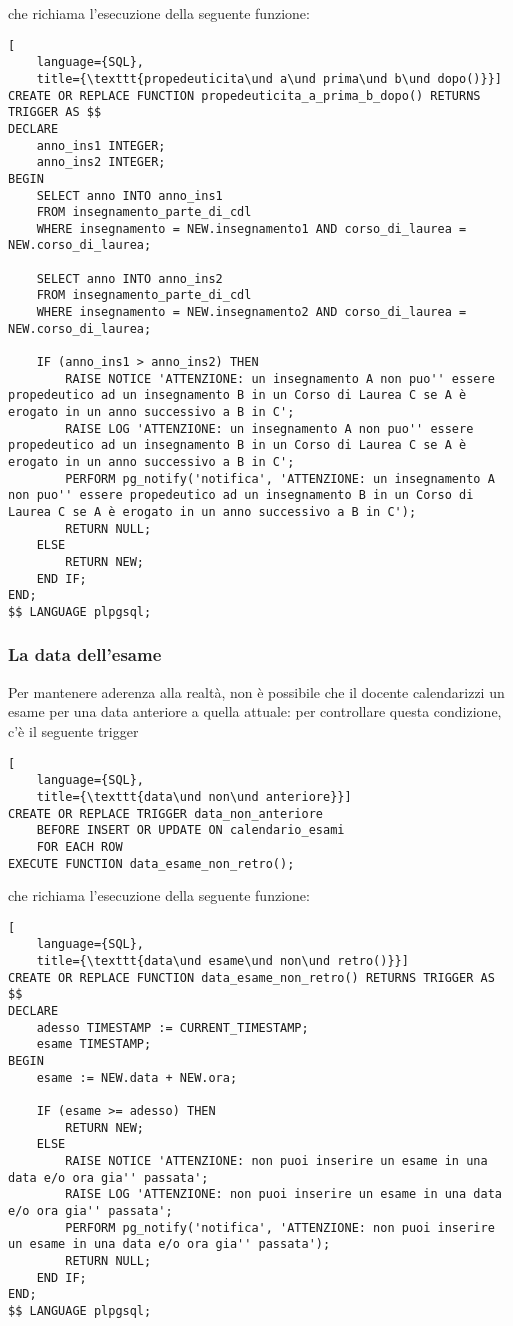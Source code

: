 \documentclass{article}
\newcommand{\und}[0]{\textunderscore}
\begin{document}
che richiama l'esecuzione della seguente funzione:

\begin{lstlisting}[
    language={SQL},
    title={\texttt{propedeuticita\und a\und prima\und b\und dopo()}}]
CREATE OR REPLACE FUNCTION propedeuticita_a_prima_b_dopo() RETURNS TRIGGER AS $$
DECLARE
    anno_ins1 INTEGER;
    anno_ins2 INTEGER;
BEGIN
    SELECT anno INTO anno_ins1
    FROM insegnamento_parte_di_cdl
    WHERE insegnamento = NEW.insegnamento1 AND corso_di_laurea = NEW.corso_di_laurea;

    SELECT anno INTO anno_ins2
    FROM insegnamento_parte_di_cdl
    WHERE insegnamento = NEW.insegnamento2 AND corso_di_laurea = NEW.corso_di_laurea;

    IF (anno_ins1 > anno_ins2) THEN
        RAISE NOTICE 'ATTENZIONE: un insegnamento A non puo'' essere propedeutico ad un insegnamento B in un Corso di Laurea C se A è erogato in un anno successivo a B in C';
        RAISE LOG 'ATTENZIONE: un insegnamento A non puo'' essere propedeutico ad un insegnamento B in un Corso di Laurea C se A è erogato in un anno successivo a B in C';
        PERFORM pg_notify('notifica', 'ATTENZIONE: un insegnamento A non puo'' essere propedeutico ad un insegnamento B in un Corso di Laurea C se A è erogato in un anno successivo a B in C');
        RETURN NULL;
    ELSE
        RETURN NEW;
    END IF;
END;
$$ LANGUAGE plpgsql;
\end{lstlisting}


\subsubsection{La data dell'esame}
Per mantenere aderenza alla realtà, non è possibile che il docente calendarizzi un esame per una data anteriore a quella attuale: per controllare questa condizione, c'è il seguente trigger


\begin{lstlisting}[
    language={SQL},
    title={\texttt{data\und non\und anteriore}}]
CREATE OR REPLACE TRIGGER data_non_anteriore
    BEFORE INSERT OR UPDATE ON calendario_esami
    FOR EACH ROW
EXECUTE FUNCTION data_esame_non_retro();
\end{lstlisting}

che richiama l'esecuzione della seguente funzione:

\begin{lstlisting}[
    language={SQL},
    title={\texttt{data\und esame\und non\und retro()}}]
CREATE OR REPLACE FUNCTION data_esame_non_retro() RETURNS TRIGGER AS $$
DECLARE
    adesso TIMESTAMP := CURRENT_TIMESTAMP;
    esame TIMESTAMP;
BEGIN
    esame := NEW.data + NEW.ora;

    IF (esame >= adesso) THEN
        RETURN NEW;
    ELSE
        RAISE NOTICE 'ATTENZIONE: non puoi inserire un esame in una data e/o ora gia'' passata';
        RAISE LOG 'ATTENZIONE: non puoi inserire un esame in una data e/o ora gia'' passata';
        PERFORM pg_notify('notifica', 'ATTENZIONE: non puoi inserire un esame in una data e/o ora gia'' passata');
        RETURN NULL;
    END IF;
END;
$$ LANGUAGE plpgsql;
\end{lstlisting}
\end{document}
